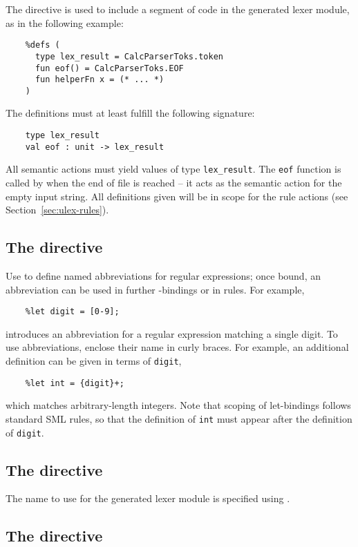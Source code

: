The  directive is used to include a segment of code in the generated lexer module, as in the following example:
\begin{verbatim}
    %defs (
      type lex_result = CalcParserToks.token
      fun eof() = CalcParserToks.EOF
      fun helperFn x = (* ... *)
    )
\end{verbatim}
The definitions must at least fulfill the following signature:
\begin{verbatim}
    type lex_result
    val eof : unit -> lex_result
\end{verbatim}
All semantic actions must yield values of type {\tt lex\_result}.  The {\tt eof} function is called by \ulex{} when the end of file is reached -- it acts as the semantic action for the empty input string.  All definitions given will be in scope for the rule actions (see Section~\ref{sec:ulex-rules}).

\subsection{The  directive}

Use  to define named abbreviations for regular expressions; once bound, an abbreviation can be used in further -bindings or in rules.  For example,
\begin{verbatim}
    %let digit = [0-9];
\end{verbatim}
introduces an abbreviation for a regular expression matching a single digit.  To use abbreviations, enclose their name in curly braces.  For example, an additional  definition can be given in terms of \texttt{digit},
\begin{verbatim}
    %let int = {digit}+;
\end{verbatim}
which matches arbitrary-length integers.  Note that scoping of let-bindings follows standard SML rules, so that the definition of \texttt{int} must appear after the definition of \texttt{digit}.

\subsection{The  directive}

The name to use for the generated lexer module is specified using .

\subsection{The  directive}

